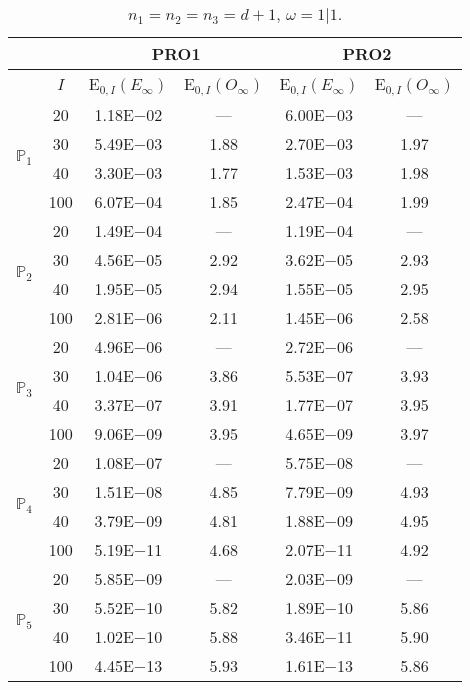 \begin{table}[H]
\caption{$n_1=n_2=n_3=d+1$, $\omega=1|1$.}
\setlength{\tabcolsep}{5pt}
\centering
\begin{tabular}{@{}l c c c c c@{}}
\toprule
 &  & \multicolumn{2}{c}{PRO1} & \multicolumn{2}{c}{PRO2}\\
\midrule
 & $I$ & E$_{0,I}(E_{\infty})$ & E$_{0,I}(O_{\infty})$ & E$_{0,I}(E_{\infty})$ & E$_{0,I}(O_{\infty})$\\
\midrule
\multirow{4}{*}{$\mathbb{P}_{1}$}
 & 20 & 1.18E$-$02 & --- & 6.00E$-$03 & ---\\
 & 30 & 5.49E$-$03 & 1.88 & 2.70E$-$03 & 1.97 \\
 & 40 & 3.30E$-$03 & 1.77 & 1.53E$-$03 & 1.98 \\
 & 100 & 6.07E$-$04 & 1.85 & 2.47E$-$04 & 1.99 \\
\midrule
\multirow{4}{*}{$\mathbb{P}_{2}$}
 & 20 & 1.49E$-$04 & --- & 1.19E$-$04 & ---\\
 & 30 & 4.56E$-$05 & 2.92 & 3.62E$-$05 & 2.93 \\
 & 40 & 1.95E$-$05 & 2.94 & 1.55E$-$05 & 2.95 \\
 & 100 & 2.81E$-$06 & 2.11 & 1.45E$-$06 & 2.58 \\
\midrule
\multirow{4}{*}{$\mathbb{P}_{3}$}
 & 20 & 4.96E$-$06 & --- & 2.72E$-$06 & ---\\
 & 30 & 1.04E$-$06 & 3.86 & 5.53E$-$07 & 3.93 \\
 & 40 & 3.37E$-$07 & 3.91 & 1.77E$-$07 & 3.95 \\
 & 100 & 9.06E$-$09 & 3.95 & 4.65E$-$09 & 3.97 \\
\midrule
\multirow{4}{*}{$\mathbb{P}_{4}$}
 & 20 & 1.08E$-$07 & --- & 5.75E$-$08 & ---\\
 & 30 & 1.51E$-$08 & 4.85 & 7.79E$-$09 & 4.93 \\
 & 40 & 3.79E$-$09 & 4.81 & 1.88E$-$09 & 4.95 \\
 & 100 & 5.19E$-$11 & 4.68 & 2.07E$-$11 & 4.92 \\
\midrule
\multirow{4}{*}{$\mathbb{P}_{5}$}
 & 20 & 5.85E$-$09 & --- & 2.03E$-$09 & ---\\
 & 30 & 5.52E$-$10 & 5.82 & 1.89E$-$10 & 5.86 \\
 & 40 & 1.02E$-$10 & 5.88 & 3.46E$-$11 & 5.90 \\
 & 100 & 4.45E$-$13 & 5.93 & 1.61E$-$13 & 5.86 \\
\bottomrule
\end{tabular}
\label{Table:PRO:Rodrigo:Test1}
\end{table}
